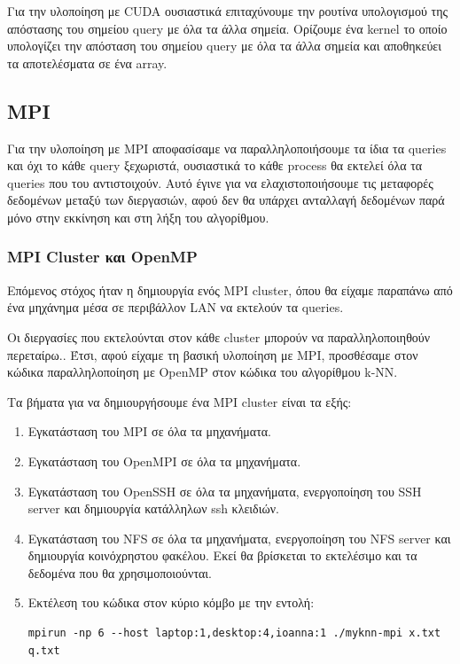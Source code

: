 \documentclass[11pt]{scrartcl} %
\begin{document}
Για την υλοποίηση με CUDA ουσιαστικά επιταχύνουμε την ρουτίνα υπολογισμού της απόστασης του σημείου
query με όλα τα άλλα σημεία.
Ορίζουμε ένα kernel  το οποίο υπολογίζει την απόσταση του σημείου query με όλα τα άλλα σημεία 
και αποθηκεύει τα αποτελέσματα σε ένα array.

\subsection{MPI}

Για την υλοποίηση με MPI αποφασίσαμε να παραλληλοποιήσουμε τα ίδια τα queries και όχι το κάθε query ξεχωριστά, 
ουσιαστικά το κάθε process θα εκτελεί όλα τα queries που του αντιστοιχούν.
Αυτό έγινε για να ελαχιστοποιήσουμε τις μεταφορές δεδομένων μεταξύ των διεργασιών, αφού δεν θα υπάρχει ανταλλαγή δεδομένων παρά μόνο στην εκκίνηση και στη λήξη του αλγορίθμου.

\subsubsection{MPI Cluster και OpenMP}

Επόμενος στόχος ήταν η δημιουργία ενός MPI cluster, όπου θα είχαμε παραπάνω από ένα μηχάνημα μέσα σε περιβάλλον LAN να εκτελούν τα queries.

Οι διεργασίες που εκτελούνται στον κάθε cluster μπορούν να παραλληλοποιηθούν περεταίρω..
Έτσι, αφού είχαμε τη βασική υλοποίηση με MPI, προσθέσαμε στον κώδικα παραλληλοποίηση με OpenMP στον κώδικα του αλγορίθμου k-NN.

Τα βήματα για να δημιουργήσουμε ένα MPI cluster είναι τα εξής:

\begin{enumerate}
\item Εγκατάσταση του MPI σε όλα τα μηχανήματα.
\item Εγκατάσταση του OpenMPI σε όλα τα μηχανήματα.
\item Εγκατάσταση του OpenSSH σε όλα τα μηχανήματα, ενεργοποίηση του SSH server και δημιουργία κατάλληλων ssh κλειδιών.
\item Εγκατάσταση του NFS \cite{nfs} σε όλα τα μηχανήματα, ενεργοποίηση του NFS server και
        δημιουργία κοινόχρηστου φακέλου. Εκεί θα βρίσκεται το εκτελέσιμο και τα
        δεδομένα που θα χρησιμοποιούνται.
\item Εκτέλεση του κώδικα στον κύριο κόμβο με την εντολή:
\begin{lstlisting}
mpirun -np 6 --host laptop:1,desktop:4,ioanna:1 ./myknn-mpi x.txt q.txt
\end{lstlisting}
\end{enumerate}
\end{document}

